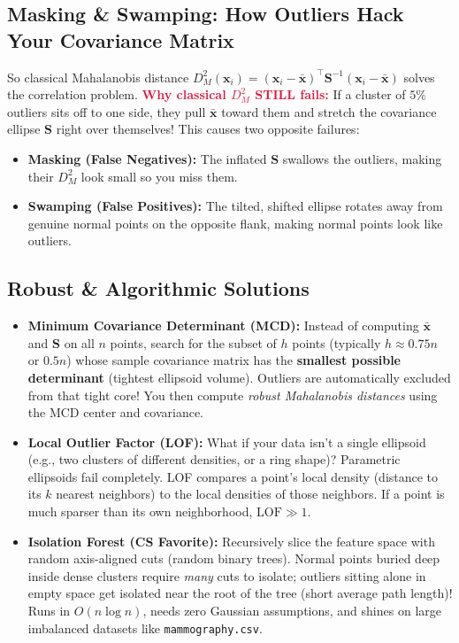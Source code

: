 \documentclass[11pt, a4paper]{article}
\begin{document}
\subsection{Masking \& Swamping: How Outliers Hack Your Covariance Matrix}
So classical Mahalanobis distance $D_M^2(\mathbf{x}_i) = (\mathbf{x}_i - \bar{\mathbf{x}})^\top \mathbf{S}^{-1}(\mathbf{x}_i - \bar{\mathbf{x}})$ solves the correlation problem. \textcolor{crimson}{\textbf{Why classical $D_M^2$ STILL fails:}} If a cluster of $5\%$ outliers sits off to one side, they pull $\bar{\mathbf{x}}$ toward them and stretch the covariance ellipse $\mathbf{S}$ right over themselves! This causes two opposite failures:
\begin{itemize}
    \item \textbf{Masking (False Negatives):} The inflated $\mathbf{S}$ swallows the outliers, making their $D_M^2$ look small so you miss them.
    \item \textbf{Swamping (False Positives):} The tilted, shifted ellipse rotates away from genuine normal points on the opposite flank, making normal points look like outliers.
\end{itemize}

\subsection{Robust \& Algorithmic Solutions}
\begin{itemize}
    \item \textbf{Minimum Covariance Determinant (MCD):} Instead of computing $\bar{\mathbf{x}}$ and $\mathbf{S}$ on all $n$ points, search for the subset of $h$ points (typically $h \approx 0.75n$ or $0.5n$) whose sample covariance matrix has the \textbf{smallest possible determinant} (tightest ellipsoid volume). Outliers are automatically excluded from that tight core! You then compute \emph{robust Mahalanobis distances} using the MCD center and covariance.
    \item \textbf{Local Outlier Factor (LOF):} What if your data isn't a single ellipsoid (e.g., two clusters of different densities, or a ring shape)? Parametric ellipsoids fail completely. LOF compares a point's local density (distance to its $k$ nearest neighbors) to the local densities of those neighbors. If a point is much sparser than its own neighborhood, $\text{LOF} \gg 1$.
    \item \textbf{Isolation Forest (CS Favorite):} Recursively slice the feature space with random axis-aligned cuts (random binary trees). Normal points buried deep inside dense clusters require \emph{many} cuts to isolate; outliers sitting alone in empty space get isolated near the root of the tree (short average path length)! Runs in $O(n \log n)$, needs zero Gaussian assumptions, and shines on large imbalanced datasets like \texttt{mammography.csv}.
\end{itemize}
\end{document}
